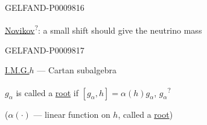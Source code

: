 \begin{GelfandAdjacentEvidence}{GELFAND-P000981}{6}


\underline{Novikov}\textsuperscript{?}: a small shift should give the neutrino mass
\end{GelfandAdjacentEvidence}
\begin{GelfandAdjacentEvidence}{GELFAND-P000981}{7}


\underline{I.M.G.}\qquad $h$ --- Cartan subalgebra

$g_\alpha$ is called a \underline{root} if $[g_\alpha,h]=\alpha(h)g_\alpha$, $g_\alpha$\textsuperscript{?}
\end{GelfandAdjacentEvidence}


($\alpha(\cdot)$ --- linear function on $h$, called a \underline{root})


